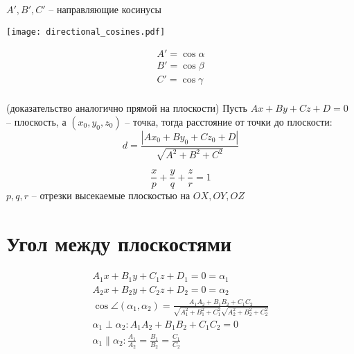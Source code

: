$A', B', C'$ -- направляющие косинусы




\noindent\begin{minipage}{.45\textwidth}
    \begin{center}
        \texttt{[image: directional\_cosines.pdf]}
    \end{center}
\end{minipage}
\begin{minipage}{.45\textwidth}
    \begin{gather*}
        A' = \cos \alpha\\
        B' = \cos \beta\\
        C' = \cos \gamma\\
    \end{gather*}
\end{minipage}

\begin{theorem} (доказательство аналогично прямой на плоскости)
            Пусть $Ax + By + Cz + D = 0$ -- плоскость, а $(x_0, y_0, z_0)$ -- точка,
              тогда расстояние от точки до плоскости:
              \[d = \frac{|Ax_0 + By_0 + Cz_0 + D|}{\sqrt{A^2 + B^2 + C^2}}\]
\end{theorem}

\begin{definition}
    \[\frac{x}{p} + \frac{y}{q} + \frac{z}{r} = 1\]
    $p,q,r$ -- отрезки высекаемые плоскостью на $OX, OY, OZ$
\end{definition}


\section{Угол между плоскостями}

\begin{definition}
    \begin{gather*}
        A_1x + B_1 y + C_1 z + D_1 = 0 = \alpha_1\\
        A_2x + B_2 y + C_2 z + D_2 = 0 = \alpha_2\\
        \cos\angle(\alpha_1, \alpha_2) =
        \frac{A_1 A_2 + B_1 B_2 + C_1 C_2}{\sqrt{A_1^2 + B_1^2 + C_1^2}\sqrt{A_2^2 + B_2^2 + C_2^2}}\\
        \alpha_1 \perp \alpha_2: A_1 A_2 + B_1 B_2 + C_1 C_2 = 0\\
        \alpha_1 \parallel \alpha_2: \frac{A_1}{A_2} = \frac{B_1}{B_2} = \frac{C_1}{C_2}
    \end{gather*}
\end{definition}


